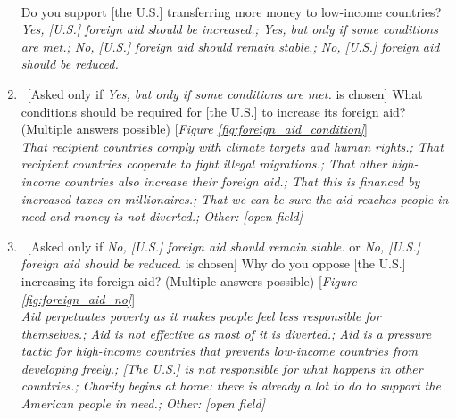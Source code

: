 \begin{enumerate}[resume]
\\
Do you support [the U.S.] transferring more money to low-income countries?
\\ \textit{Yes, [U.S.] foreign aid should be increased.; Yes, but only if some conditions are met.; No, [U.S.] foreign aid should remain stable.; No, [U.S.] foreign aid should be reduced.}
\item ~[Asked only if \textit{Yes, but only if some conditions are met.} is chosen] \label{q:foreign_aid_condition} What conditions should be required for [the U.S.] to increase its foreign aid? (Multiple answers possible) [\textit{Figure \ref{fig:foreign_aid_condition}}]
\\ \textit{That recipient countries comply with climate targets and human rights.; That recipient countries cooperate to fight illegal migrations.; That other high-income countries also increase their foreign aid.; That this is financed by increased taxes on millionaires.; That we can be sure the aid reaches people in need and money is not diverted.; Other: [open field]}
\item ~[Asked only if \textit{No, [U.S.] foreign aid should remain stable.} or \textit{No, [U.S.] foreign aid should be reduced.} is chosen] \label{q:foreign_aid_no} Why do you oppose [the U.S.] increasing its foreign aid? (Multiple answers possible) [\textit{Figure \ref{fig:foreign_aid_no}}]
\\ \textit{Aid perpetuates poverty as it makes people feel less responsible for themselves.; Aid is not effective as most of it is diverted.; Aid is a pressure tactic for high-income countries that prevents low-income countries from developing freely.; [The U.S.] is not responsible for what happens in other countries.; Charity begins at home: there is already a lot to do to support the American people in need.; Other: [open field]}
\end{enumerate}

